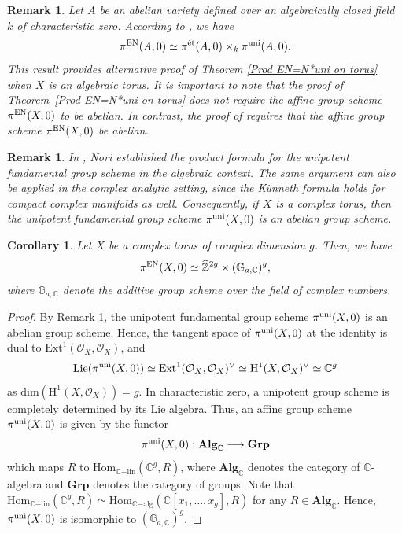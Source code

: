 \documentclass[12pt, reqno]{amsart}
\theoremstyle{plain}
\newtheorem{cor}[theorem]{Corollary}
\newtheorem{remark}[theorem]{Remark}
\numberwithin{equation}{section}
\begin{document}
\begin{remark}
\rm Let $A$ be an abelian variety defined over an algebraically closed field $k$ of characteristic zero. According to \cite[Corollary 3.5]{AA}, we have 
$$\pi^{\rm EN}(A,0)\simeq \pi^{\rm \acute{e}t}(A,0)\times_k \pi^{\rm uni}(A,0).$$
This result provides alternative proof of Theorem \ref{Prod EN=N*uni on torus} when $X$ is an algebraic torus. It is important to note that the proof of Theorem~\ref{Prod EN=N*uni on torus} does not require the affine group scheme $\pi^{\rm EN}(X,0)$ to be abelian. In contrast, the proof of \cite[Corollary 3.5]{AA} requires that the affine group scheme $\pi^{\rm EN}(X,0)$ be abelian.
\end{remark}

\begin{remark}\label{R:ProdF U}
	\rm
	In \cite[Chapter~IV, Lemma~8]{No}, Nori established the product formula for the unipotent fundamental group scheme in the algebraic context. The same argument can also be applied in the complex analytic setting, since the K\"unneth formula holds for compact complex manifolds as well. 
Consequently, if $X$ is a complex torus, then the unipotent fundamental group scheme $\pi^{\rm uni}(X,0)$ is an abelian group scheme.
\end{remark}

\begin{cor}
	Let $X$ be a complex torus of complex dimension $g$. Then, we have 
	$$\pi^{\rm EN}(X,0) \simeq \widehat{\mathbb{Z}}^{2g} \times (\mathbb{G}_{a, \mathbb{C}})^{g},$$
	where $\mathbb{G}_{a, \mathbb{C}}$ denote the additive group scheme over the field of complex numbers.
\end{cor}
\begin{proof}
By Remark \ref{R:ProdF U}, the unipotent fundamental group scheme $\pi^{\rm uni}(X,0)$ is an abelian group scheme. Hence, the tangent space of $\pi^{\rm uni}(X,0)$ at the identity is dual to $\mathrm{Ext}^1(\mathcal{O}_X, \mathcal{O}_X)$, and
$$\mathrm{Lie}(\pi^{\rm uni}(X,0))\simeq \mathrm{Ext}^1(\mathcal{O}_X, \mathcal{O}_X)^{\vee}\simeq \mathrm{H}^1(X,\mathcal{O}_X)^{\vee}\simeq \mathbb{C}^{g}$$
as $\mathrm{dim}(\mathrm{H}^1(X,\mathcal{O}_X))=g$. In characteristic zero, a unipotent group scheme is completely determined by its Lie algebra. Thus, an affine group scheme $\pi^{\rm uni}(X,0)$ is given by the functor
$$\pi^{\rm uni}(X,0): \mathbf{Alg}_{\mathbb{C}} \longrightarrow \mathbf{Grp}$$
which maps $R$ to $\mathrm{Hom}_{\mathbb{C}\mathrm{-lin}}(\mathbb{C}^g, R)$, where $\mathbf{Alg}_{\mathbb{C}}$ denotes the category of $\mathbb{C}$-algebra and $\mathbf{Grp}$ denotes the category of groups. Note that $\mathrm{Hom}_{\mathbb{C}\mathrm{-lin}}(\mathbb{C}^g, R) \simeq \mathrm{Hom}_{\mathbb{C}\mathrm{-alg}}(\mathbb{C}[x_1,\ldots, x_g], R)$ for any $R \in \mathbf{Alg}_{\mathbb{C}}$. Hence, $\pi^{\rm uni}(X,0)$ is isomorphic to $(\mathbb{G}_{a, \mathbb{C}})^{g}$.
\end{proof}
\end{document}
